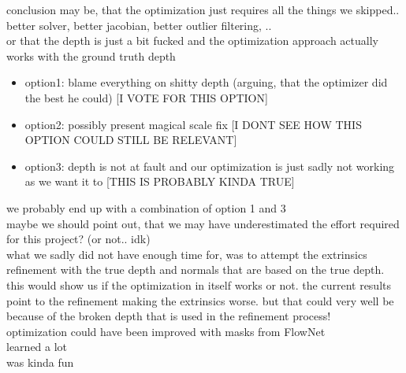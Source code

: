     conclusion may be, that the optimization just requires all the things we skipped.. better solver, better jacobian, better outlier filtering, ..\\
    or that the depth is just a bit fucked and the optimization approach actually works with the ground truth depth
    \begin{itemize}
        \item option1: blame everything on shitty depth (arguing, that the optimizer did the best he could) [I VOTE FOR THIS OPTION]
        \item option2: possibly present magical scale fix [I DONT SEE HOW THIS OPTION COULD STILL BE RELEVANT]
        \item option3: depth is not at fault and our optimization is just sadly not working as we want it to [THIS IS PROBABLY KINDA TRUE]
    \end{itemize}
    we probably end up with a combination of option 1 and 3\\
    maybe we should point out, that we may have underestimated the effort required for this project? (or not.. idk)\\
    what we sadly did not have enough time for, was to attempt the extrinsics refinement with the true depth and normals that are based on the true depth. this would show us if the optimization in itself works or not. the current results point to the refinement making the extrinsics worse. but that could very well be because of the broken depth that is used in the refinement process!\\
    optimization could have been improved with masks from FlowNet\\
    learned a lot\\
    was kinda fun\\
    